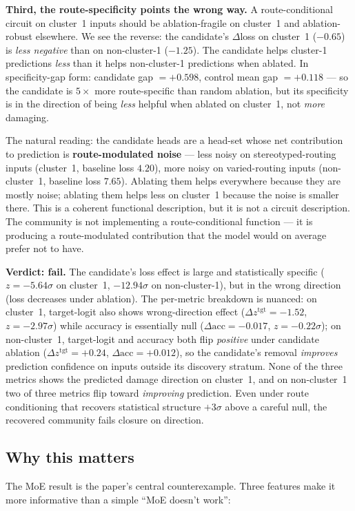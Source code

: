 \documentclass[11pt]{article}
\begin{document}
\textbf{Third, the route-specificity points the wrong way.} A
route-conditional circuit on cluster~1 inputs should be ablation-fragile
on cluster~1 and ablation-robust elsewhere. We see the reverse: the
candidate's $\Delta$loss on cluster~1 ($-0.65$) is \emph{less negative}
than on non-cluster-1 ($-1.25$). The candidate helps cluster-1
predictions \emph{less} than it helps non-cluster-1 predictions when
ablated. In specificity-gap form: candidate gap $= +0.598$, control mean
gap $= +0.118$ --- so the candidate is $5\times$ more route-specific than
random ablation, but its specificity is in the direction of being
\emph{less} helpful when ablated on cluster~1, not \emph{more} damaging.

The natural reading: the candidate heads are a head-set whose net
contribution to prediction is \textbf{route-modulated noise} --- less
noisy on stereotyped-routing inputs (cluster~1, baseline loss $4.20$),
more noisy on varied-routing inputs (non-cluster~1, baseline loss
$7.65$). Ablating them helps everywhere because they are mostly noise;
ablating them helps less on cluster~1 because the noise is smaller there.
This is a coherent functional description, but it is not a circuit
description. The community is not implementing a route-conditional
function --- it is producing a route-modulated contribution that the
model would on average prefer not to have.

\textbf{Verdict: fail.} The candidate's loss effect is large and
statistically specific ($z = -5.64\sigma$ on cluster~1, $-12.94\sigma$ on
non-cluster-1), but in the wrong direction (loss decreases under
ablation). The per-metric breakdown is nuanced:
on cluster~1, target-logit also shows wrong-direction effect
($\Delta z^{\text{tgt}} = -1.52$, $z = -2.97\sigma$) while accuracy is
essentially null ($\Delta\text{acc} = -0.017$, $z = -0.22\sigma$); on
non-cluster~1, target-logit and accuracy both flip
\emph{positive} under candidate ablation ($\Delta z^{\text{tgt}} = +0.24$,
$\Delta\text{acc} = +0.012$), so the candidate's removal
\emph{improves} prediction confidence on inputs outside its discovery
stratum. None of the three metrics shows the predicted damage direction
on cluster~1, and on non-cluster~1 two of three metrics flip toward
\emph{improving} prediction. Even under route conditioning that recovers
statistical structure $+3\sigma$ above a careful null, the recovered
community fails closure on direction.

\subsection{Why this matters}
The MoE result is the paper's central counterexample. Three features make
it more informative than a simple ``MoE doesn't work'':
\end{document}
